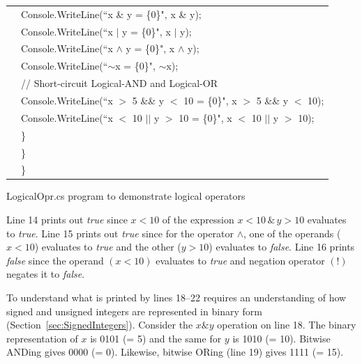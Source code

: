 \begin{program}
\begin{tabular}{>{\codelinenumfont}l>{\codelistingfont}l}
18 &  \hspace{0.6in} Console.WriteLine(``x \& y = \{0\}", x \& y);\\

19 &  \hspace{0.6in} Console.WriteLine(``x $\vert$ y = \{0\}", x $\vert$ y);\\

20 &  \hspace{0.6in} Console.WriteLine(``x $\wedge$ y = \{0\}", x $\wedge$ y); \\

21 &  \hspace{0.6in} Console.WriteLine(``$\sim$x = \{0\}", $\sim$x);\\

22 &  \hspace{0.6in} // Short-circuit Logical-AND and Logical-OR\\

23 &  \hspace{0.6in} Console.WriteLine(``x $>$ 5 \&\& y $<$ 10 = \{0\}", x $>$ 5 \&\& y $<$ 10);\\

24 &  \hspace{0.6in} Console.WriteLine(``x $<$ 10 $\vert\!\vert$ y $>$ 10 = \{0\}", x $<$ 10 $\vert\!\vert$ y $>$ 10);\\

25 & \hspace{0.4in} \} \\

26 & \hspace{0.2in} \} \\

27 & \} \\

\end{tabular}
\caption{LogicalOpr.cs program to demonstrate logical operators}
\label{tab:LogicalOpr}
\end{program}
\renewcommand{\baselinestretch}{1.0}


Line 14 prints out \emph{true} since $x < 10$ of the expression $x
< 10 \, \& \, y > 10$ evaluates to \emph{true}. Line 15 prints out
\emph{true} since for the operator $\wedge$, one of the operands
($x < 10$) evaluates to \emph{true} and the other ($y > 10$)
evaluates to \emph{false}. Line 16 prints \emph{false} since the
operand $(x < 10)$ evaluates to \emph{true} and negation operator
$(!)$ negates it to \emph{false}.

To understand what is printed by lines 18--22 requires an
understanding of how signed and unsigned integers are represented
in binary form (Section~\ref{sec:SignedIntegers}). Consider the $x
\& y$ operation on line 18. The binary representation of $x$ is
0101 (= 5) and the same for $y$ is 1010 (= 10). Bitwise ANDing
gives 0000 (= 0). Likewise, bitwise ORing (line 19) gives 1111 (=
15).




